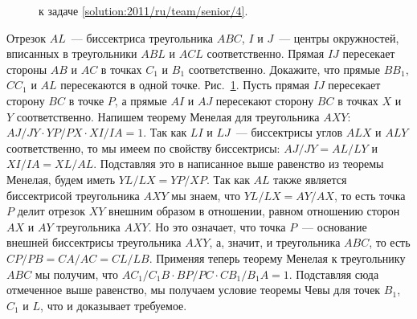 \ifsolution
\begin{figure}\centering
    \caption{к задаче \ref{solution:2011/ru/team/senior/4}.}
    \label{fig:solution:2011/ru/team/senior/4}
\end{figure}
\fi %

\problem{}
Отрезок $AL$~--- биссектриса треугольника $ABC$, $I$ и $J$~--- центры
окружностей, вписанных в треугольники $ABL$ и $ACL$ соответственно.
Прямая $IJ$ пересекает стороны $AB$ и $AC$ в точках $C_1$ и $B_1$
соответственно.
Докажите, что прямые $B B_1$, $C C_1$ и $AL$ пересекаются в одной точке.
\solution
\label{solution:2011/ru/team/senior/4}%
Рис.~\ref{fig:solution:2011/ru/team/senior/4}.
Пусть прямая $IJ$ пересекает сторону $BC$ в точке $P$, а прямые $AI$ и $AJ$
пересекают сторону $BC$ в точках $X$ и $Y$ соответственно.
Напишем теорему Менелая для треугольника $AXY$:
\(
    AJ / JY
    \cdot
    YP / PX
    \cdot
    XI / IA
=
    1
\).
Так как $LI$ и $LJ$~--- биссектрисы углов $ALX$ и $ALY$ соответственно, то мы
имеем по свойству биссектрисы:
$AJ / JY = AL / LY$ и $XI / IA = XL / AL$.
Подставляя это в написанное выше равенство из теоремы Менелая, будем иметь
$YL / LX = YP / XP$.
Так как $AL$ также является биссектрисой треугольника $AXY$ мы знаем, что
$YL / LX = AY / AX$, то есть точка $P$ делит отрезок $XY$ внешним
образом в отношении, равном отношению сторон $AX$ и $AY$ треугольника $AXY$.
Но это означает, что точка $P$~--- основание внешней биссектрисы треугольника
$AXY$, а, значит, и треугольника $ABC$, то есть
$CP / PB = CA / AC = CL / LB$.
Применяя теперь теорему Менелая к треугольнику $ABC$ мы получим, что
\(
    A C_1 / C_1 B
    \cdot
    BP / PC
    \cdot
    C B_1 / B_1 A
=
    1
\).
Подставляя сюда отмеченное выше равенство, мы получаем условие теоремы Чевы для
точек $B_1$, $C_1$ и $L$, что и доказывает требуемое.
\endproblem
